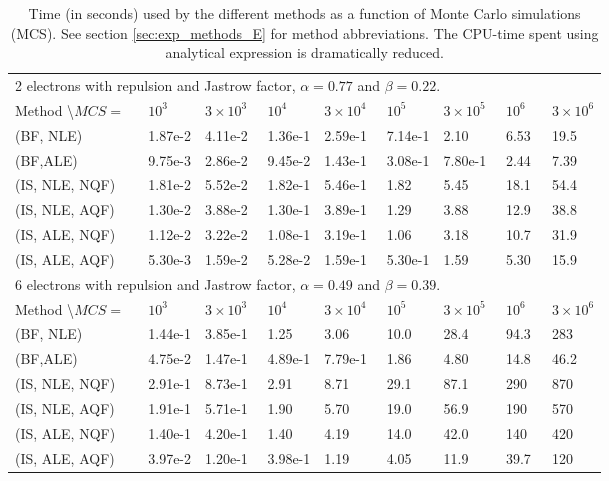 \begin{table}[h!]
	\centering 
	\begin{tabular}{l @{ } l @{ } l @{ } l @{ } l @{ } l @{ } l @{ } l @{ } l }
	\toprule
	\multicolumn{9}{l}{2 electrons with repulsion and Jastrow factor, $\alpha = 0.77$ and $\beta = 0.22$.} \\
	Method \textbackslash $MCS = ~~~$ & $10^3~~~~~~~$ & $3\times 10^3~~$ & $10^4~~~~~~~$ & $3\times 10^4~~$ & $10^5~~~~~~~$ & $3\times 10^5~~$ & $10^6~~~~$ & $3\times 10^6$ \\
	\midrule
	(BF, NLE) & 1.87e-2 & 4.11e-2 & 1.36e-1 & 2.59e-1 & 7.14e-1 & 2.10 & 6.53 & 19.5 \\
	\shaderow (BF,ALE) & 9.75e-3 & 2.86e-2 & 9.45e-2 & 1.43e-1 & 3.08e-1 & 7.80e-1 & 2.44 & 7.39 \\
	(IS, NLE, NQF) & 1.81e-2 & 5.52e-2 & 1.82e-1 & 5.46e-1 & 1.82 & 5.45 & 18.1 & 54.4 \\
	\shaderow (IS, NLE, AQF) & 1.30e-2 & 3.88e-2 & 1.30e-1 & 3.89e-1 & 1.29 & 3.88 & 12.9 & 38.8 \\
	(IS, ALE, NQF) & 1.12e-2 & 3.22e-2 & 1.08e-1 & 3.19e-1 & 1.06 & 3.18 & 10.7 & 31.9 \\
	\shaderow (IS, ALE, AQF) & 5.30e-3 & 1.59e-2 & 5.28e-2 & 1.59e-1 & 5.30e-1 & 1.59 & 5.30 & 15.9 \\
	\bottomrule
	\toprule
	\multicolumn{9}{l}{6 electrons with repulsion and Jastrow factor, $\alpha = 0.49$ and $\beta = 0.39$.} \\
	Method \textbackslash $MCS = ~~~$ & $10^3~~~~~~~$ & $3\times 10^3~~$ & $10^4~~~~~~~$ & $3\times 10^4~~$ & $10^5~~~~~~~$ & $3\times 10^5~~$ & $10^6~~~~$ & $3\times 10^6$ \\
	\midrule
	(BF, NLE) &  1.44e-1 & 3.85e-1 & 1.25 & 3.06 & 10.0 & 28.4 & 94.3 & 283 \\
	\shaderow (BF,ALE) &  4.75e-2 & 1.47e-1 & 4.89e-1 & 7.79e-1 & 1.86 & 4.80 & 14.8 & 46.2 \\
	(IS, NLE, NQF) & 2.91e-1 & 8.73e-1 & 2.91 & 8.71 & 29.1 & 87.1 & 290 & 870 \\
	\shaderow (IS, NLE, AQF) & 1.91e-1 & 5.71e-1 & 1.90 & 5.70 & 19.0 & 56.9 & 190 & 570 \\
	(IS, ALE, NQF) & 1.40e-1 & 4.20e-1 & 1.40 & 4.19 & 14.0 & 42.0 & 140 & 420 \\
	\shaderow (IS, ALE, AQF) & 3.97e-2 & 1.20e-1 & 3.98e-1 & 1.19 & 4.05 & 11.9 & 39.7 & 120 \\
	\bottomrule
	\end{tabular}
	\caption{Time (in seconds) used by the different methods as a function of Monte Carlo simulations (MCS).
			See section \ref{sec:exp_methods_E} for method abbreviations.
			The CPU-time spent using analytical expression is dramatically reduced. }
	\label{tab:res_times}
\end{table}


